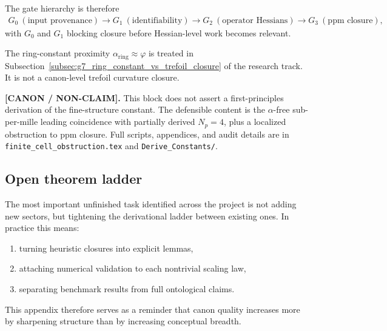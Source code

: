 \documentclass[11pt]{article}
\theoremstyle{definition}
\theoremstyle{plain}
\theoremstyle{remark}
\begin{document}
            The gate hierarchy is therefore
            \begin{align}
                G_0\ (\text{input provenance})
                \longrightarrow
                G_1\ (\text{identifiability})
                \longrightarrow
                G_2\ (\text{operator Hessians})
                \longrightarrow
                G_3\ (\text{ppm closure}),
                \label{eq:finite_cell_gate_hierarchy}
            \end{align}
            with $G_0$ and $G_1$ blocking closure before Hessian-level work becomes relevant.

            The ring-constant proximity $\alpha_{\mathrm{ring}}\approx\varphi$ is treated in
            Subsection~\ref{subsec:g7_ring_constant_vs_trefoil_closure} of the
            research track. It is not a canon-level trefoil curvature closure.

            \textbf{[CANON / NON-CLAIM].}
            This block does not assert a first-principles derivation of the fine-structure
            constant. The defensible content is the $\alpha$-free sub-per-mille leading
            coincidence with partially derived $N_p=4$, plus a localized obstruction to
            ppm closure. Full scripts, appendices, and audit details are in
            \texttt{finite\_cell\_obstruction.tex} and \texttt{Derive\_Constants/}.
        \subsection{Open theorem ladder}
            The most important unfinished task identified across the project is not adding new sectors, but tightening the derivational ladder between existing ones. In practice this means:
            \begin{enumerate}
                \item turning heuristic closures into explicit lemmas,
                \item attaching numerical validation to each nontrivial scaling law,
                \item separating benchmark results from full ontological claims.
            \end{enumerate}
            This appendix therefore serves as a reminder that canon quality increases more by sharpening structure than by increasing conceptual breadth.

 
\end{document}
